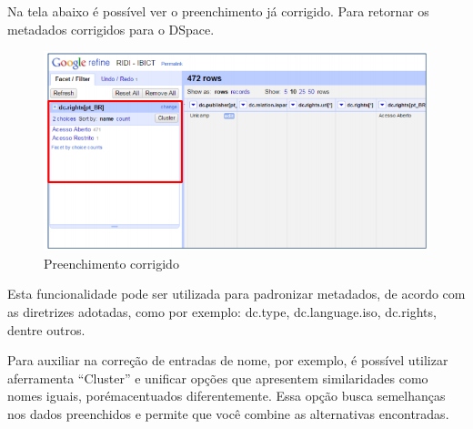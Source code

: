 \documentclass[12pt,hidelinks]{article}
\begin{document}
\newpage

    Na tela abaixo é possível ver o preenchimento já corrigido. Para retornar os metadados corrigidos para o DSpace.
    
    \begin{figure}[!htp]
                \centering
                \includegraphics[scale=0.9]{figura/Figura193.png}
                \caption{Preenchimento corrigido}
            \label{Rotulo}
        \end{figure}
    
    Esta funcionalidade pode ser utilizada para padronizar metadados, de acordo com as diretrizes adotadas, como por exemplo: dc.type, dc.language.iso, dc.rights, dentre outros.
    
    \singlespacing
    
    Para auxiliar na correção de entradas de nome, por exemplo, é possível utilizar aferramenta “Cluster” e unificar opções que apresentem similaridades como nomes iguais, porémacentuados diferentemente. Essa opção busca semelhanças nos dados preenchidos e permite que você combine as alternativas encontradas.
    
\end{document}
